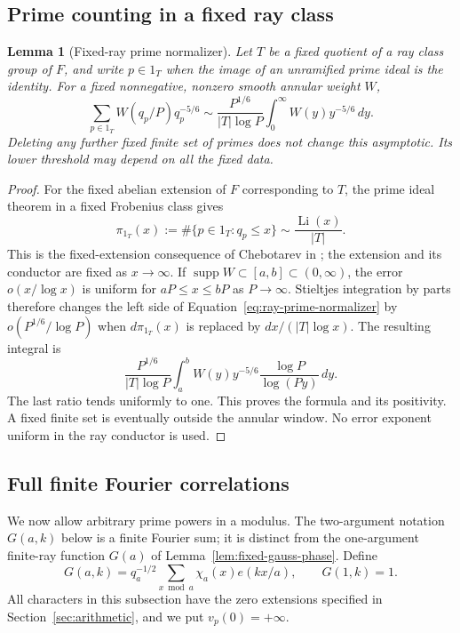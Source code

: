 \documentclass[11pt,a4paper]{article}
\numberwithin{equation}{section}
\numberwithin{figure}{section}
\newtheorem{lemma}[theorem]{Lemma}
\theoremstyle{definition}
\theoremstyle{remark}
\begin{document}
\subsection{Prime counting in a fixed ray class}

\begin{lemma}[Fixed-ray prime normalizer]\label{lem:ray-prime-normalizer}
Let $T$ be a fixed quotient of a ray class group of $F$, and write
$p\in1_T$ when the image of an unramified prime ideal is the identity.
For a fixed nonnegative, nonzero smooth annular weight $W$,
\begin{equation}\label{eq:ray-prime-normalizer}
 \sum_{p\in1_T}W(q_p/P)q_p^{-5/6}
 \sim\frac{P^{1/6}}{|T|\log P}
      \int_0^\infty W(y)y^{-5/6}\,dy.
\end{equation}
Deleting any further fixed finite set of primes does not change this
asymptotic.  Its lower threshold may depend on all the fixed data.
\end{lemma}

\begin{proof}
For the fixed abelian extension of $F$ corresponding to $T$, the prime ideal
theorem in a fixed Frobenius class gives
\[
 \pi_{1_T}(x):=\#\{p\in1_T:q_p\le x\}
       \sim\frac{\operatorname{Li}(x)}{|T|}.
\]
This is the fixed-extension consequence of Chebotarev in
\cite[Theorem 1.1]{TZ}; the extension and its conductor are fixed as
$x\to\infty$.  If $\operatorname{supp}W\subset[a,b]\subset(0,\infty)$,
the error $o(x/\log x)$ is uniform for $aP\le x\le bP$ as $P\to\infty$.
Stieltjes integration by parts therefore changes the left side of
Equation~\eqref{eq:ray-prime-normalizer} by $o(P^{1/6}/\log P)$ when
$d\pi_{1_T}(x)$ is replaced by $dx/(|T|\log x)$.  The resulting integral is
\[
 \frac{P^{1/6}}{|T|\log P}
 \int_a^b W(y)y^{-5/6}\frac{\log P}{\log(Py)}\,dy.
\]
The last ratio tends uniformly to one.  This proves the formula and its
positivity.  A fixed finite set is eventually outside the annular window.
No error exponent uniform in the ray conductor is used.
\end{proof}

\subsection{Full finite Fourier correlations}\label{sec:finite-correlations}

We now allow arbitrary prime powers in a modulus.  The two-argument notation
$G(a,k)$ below is a finite Fourier sum; it is distinct from the one-argument
finite-ray function $G(a)$ of Lemma~\ref{lem:fixed-gauss-phase}.  Define
\begin{equation}
 G(a,k)=q_a^{-1/2}\sum_{x\bmod a}\chi_a(x)e(kx/a),\qquad G(1,k)=1.
 \label{old-eq:2.4}
\end{equation}
All characters in this subsection have the zero extensions specified in
Section~\ref{sec:arithmetic},
and we put $v_p(0)=+\infty$.
\end{document}

